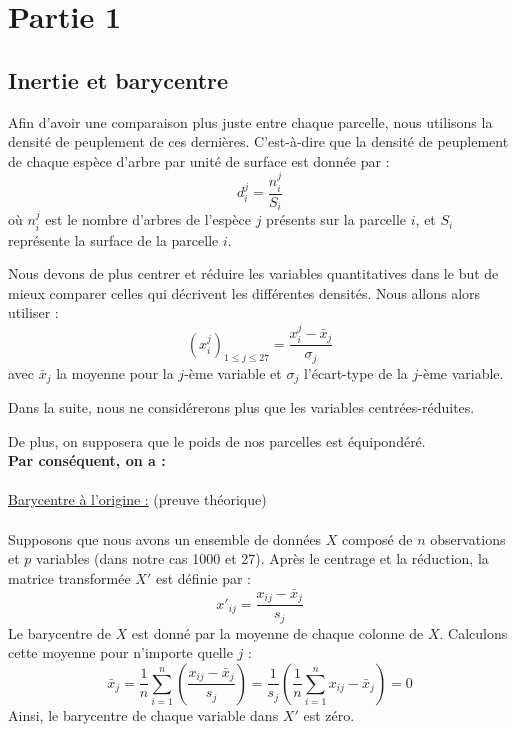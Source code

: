 \documentclass{article}
\begin{document}
\section{Partie 1}
\subsection{Inertie et barycentre}

Afin d'avoir une comparaison plus juste entre chaque parcelle, nous utilisons la densité de peuplement de ces dernières. C'est-à-dire que la densité de peuplement de chaque espèce d'arbre par unité de surface est donnée par :
\[
d^j_i = \frac{n^j_i}{S_i}
\]
où $n^j_i$ est le nombre d'arbres de l'espèce $j$ présents sur la parcelle $i$, et $S_i$ représente la surface de la parcelle $i$.

Nous devons de plus centrer et réduire les variables quantitatives dans le but de mieux comparer celles qui décrivent les différentes densités. Nous allons alors utiliser :
\[
(x^j_i)_{1 \leq j \leq 27} = \frac{x^j_i - \bar{x}_j}{\sigma_j}
\]
avec $\bar{x}_j$ la moyenne pour la $j$-ème variable et $\sigma_j$ l'écart-type de la $j$-ème variable.

Dans la suite, nous ne considérerons plus que les variables centrées-réduites.

De plus, on supposera que le poids de nos parcelles est équipondéré.
\vspace{2\baselineskip}
\\
\textbf{Par conséquent, on a :}
\\
\\
\indent\underline{Barycentre à l'origine :} (preuve théorique)
\\
\\
Supposons que nous avons un ensemble de données \(X\) composé de \(n\) observations et \(p\) variables (dans notre cas 1000 et 27). Après le centrage et la réduction, la matrice transformée \(X'\) est définie par :
\[
x'_{ij} = \frac{x_{ij} - \bar{x}_j}{s_j}
\]
Le barycentre de \(X\) est donné par la moyenne de chaque colonne de \(X\). Calculons cette moyenne pour n'importe quelle \(j\) :
\[
\bar{x}_j = \frac{1}{n} \sum_{i=1}^n \left( \frac{x_{ij} - \bar{x}_j}{s_j} \right) = \frac{1}{s_j} \left( \frac{1}{n} \sum_{i=1}^n x_{ij} - \bar{x}_j \right) = 0
\]
Ainsi, le barycentre de chaque variable dans \(X'\) est zéro.
\\
\end{document}
